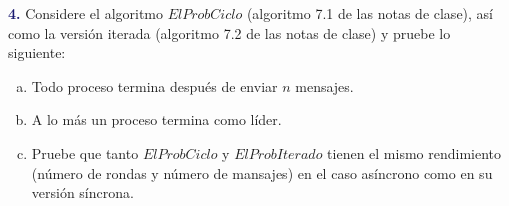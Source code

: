 \textbf{\textcolor{MidnightBlue}{4.}}
Considere el algoritmo $ElProbCiclo$ (algoritmo 7.1 de las notas de clase), así como
la versión iterada (algoritmo 7.2 de las notas de clase) y pruebe lo siguiente:
\begin{enumerate}[a)]
\item Todo proceso termina después de enviar $n$ mensajes.
\item A lo más un proceso termina como líder.
\item Pruebe que tanto $ElProbCiclo$ y $ElProbIterado$ tienen el mismo rendimiento
(número de rondas y número de mansajes) en el caso asíncrono como en su versión
síncrona.
\end{enumerate}
